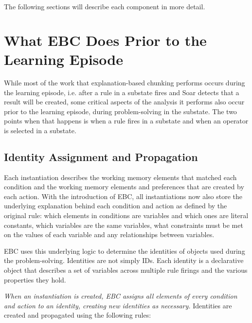 The following sections will describe each component in more detail. 


\section{What EBC Does Prior to the Learning Episode}
\label{CHUNKING-prior}

While most of the work that explanation-based chunking performs occurs during the learning episode, i.e. after a rule in a substate fires and Soar detects that a result will be created, some critical aspects of the analysis it performs also occur prior to the learning episode, during problem-solving in the substate.  The two points when that happens is when a rule fires in a substate and when an operator is selected in a substate.

\subsection{Identity Assignment and Propagation}
\label{CHUNKING-prior-identities}

Each instantiation describes the working memory elements that matched each condition and the working memory elements and preferences that are created by each action.  With the introduction of EBC, all instantiations now also store the underlying explanation behind each condition and action as defined by the original rule: which elements in conditions are variables and which ones are literal constants, which variables are the same variables, what constraints must be met on the values of each variable and any relationships between variables.

EBC uses this underlying logic to determine the identities of objects used during the problem-solving.  Identities are not simply IDs.  Each identity is a declarative object that describes a set of variables across multiple rule firings and the various properties they hold. 

\emph{When an instantiation is created, EBC assigns all elements of every condition and action to an identity, creating new identities as necessary.} Identities are created and propagated using the following rules:


